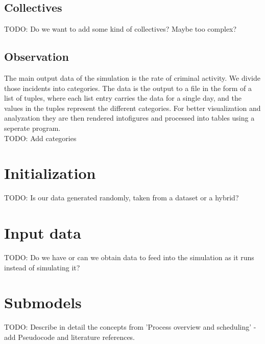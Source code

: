 \documentclass{article}
\begin{document}
		\subsection{Collectives}
			TODO: Do we want to add some kind of collectives? Maybe too complex?

		\subsection{Observation}
			The main output data of the simulation is the rate of criminal activity. We divide
			those incidents into categories. The data is the output to a file in the form of a
			list of tuples, where each list entry carries the data for a single day, and the
			values in the tuples represent the different categories. For better visualization and
			analyzation they are then rendered intofigures and processed into tables using a
			seperate program.\\
			TODO: Add categories

	\section{Initialization}
		TODO: Is our data generated randomly, taken from a dataset or a hybrid?

	\section{Input data}
		TODO: Do we have or can we obtain data to feed into the simulation as it runs instead of
		simulating it?

	\section{Submodels}
		TODO: Describe in detail the concepts from 'Process overview and scheduling' - add
		Pseudocode and literature references.
\end{document}
